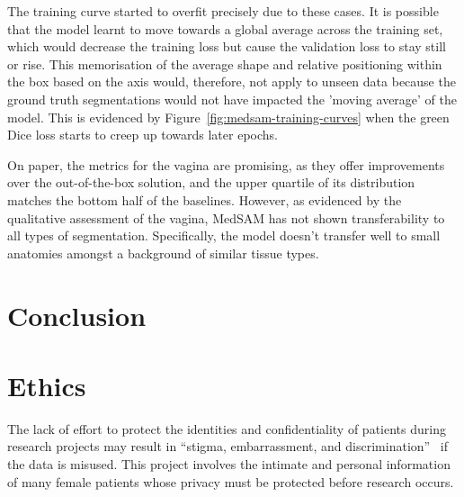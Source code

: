\documentclass[12pt,twoside]{report}
\begin{document}
The training curve started to overfit precisely due to these cases. It is possible that the model learnt to move towards a global average across the training set, which would decrease the training loss but cause the validation loss to stay still or rise. This memorisation of the average shape and relative positioning within the box based on the axis would, therefore, not apply to unseen data because the ground truth segmentations would not have impacted the 'moving average' of the model. This is evidenced by Figure~\ref{fig:medsam-training-curves} when the green Dice loss starts to creep up towards later epochs.

On paper, the metrics for the vagina are promising, as they offer improvements over the out-of-the-box solution, and the upper quartile of its distribution matches the bottom half of the baselines. However, as evidenced by the qualitative assessment of the vagina, MedSAM has not shown transferability to all types of segmentation. Specifically, the model doesn't transfer well to small anatomies amongst a background of similar tissue types. %

\chapter{Conclusion}\label{sect:conclusion}




\chapter{Ethics}

The lack of effort to protect the identities and confidentiality of patients during research projects may result in ``stigma, embarrassment, and discrimination''~\cite{health-privacy} if the data is misused.
This project involves the intimate and personal information of many female patients whose privacy must be protected before research occurs.
\end{document}
